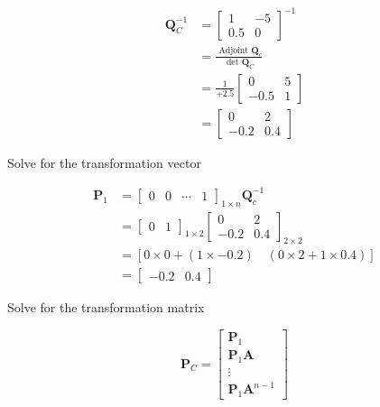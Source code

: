 \documentclass[main.tex]{subfiles}
\begin{document}
\begin{enumerate}
\begin{enumerate}
        $$
        \begin{aligned}
        \textbf{Q}_C^{-1} & =\left[\begin{array}{cc}
        1 & -5 \\
        0.5 & 0
        \end{array}\right]^{-1} \\
        & =\frac{\text { Adjoint } \textbf{Q}_c}{\text { det } \textbf{Q}_C} \\
        & =\frac{1}{+2.5}\left[\begin{array}{ll}
        0 & 5 \\
        -0.5 & 1
        \end{array}\right] \\
        & =\left[\begin{array}{cc}
        0 & 2 \\
        -0.2 & 0.4
        \end{array}\right]
        \end{aligned}
        $$

        Solve for the transformation vector

        $$
        \begin{aligned}
        \textbf{P}_1 &= \left[\begin{array}{llll}
        0 & 0 & \cdots & 1
        \end{array}\right]_{1 \times n} \textbf{Q}_c^{-1} \\
        &=\left[\begin{array}{ll}
        0 & 1
        \end{array}\right]_{1 \times 2}\left[\begin{array}{cc}
        0 & 2 \\
        -0.2 & 0.4
        \end{array}\right]_{2 \times 2} \\
        &=[0 \times 0+(1 \times-0.2) \quad (0 \times 2+1 \times 0.4)] \\
        &=\left[\begin{array}{ll}
        -0.2 & 0.4
        \end{array}\right]
        \end{aligned}
        $$

        Solve for the transformation matrix 

        $$
        \textbf{P}_C=\left[\begin{array}{cc}
        \textbf{P}_1 \\
        \textbf{P}_1 \textbf{A} \\
        \vdots \\
        \textbf{P}_1 \textbf{A}^{n-1}
        \end{array}\right]
        $$


\end{enumerate}
\end{enumerate}
\end{document}
